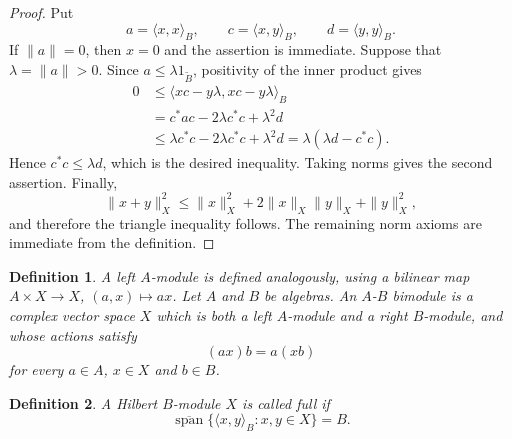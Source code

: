 \documentclass{book}
\newtheorem{definition}{Definition}[section]
\begin{document}
\begin{proof}
  Put
  \[
    a=\langle x,x\rangle_B,
    \qquad
    c=\langle x,y\rangle_B,
    \qquad
    d=\langle y,y\rangle_B.
  \]
  If \(\|a\|=0\), then \(x=0\) and the assertion is immediate. Suppose that
  \(\lambda=\|a\|>0\). Since \(a\leq\lambda 1_{\widetilde B}\), positivity of the
  inner product gives
  \begin{align*}
    0
    &\leq
    \langle xc-y\lambda,xc-y\lambda\rangle_B\\
    &=c^*ac-2\lambda c^*c+\lambda^2d\\
    &\leq
    \lambda c^*c-2\lambda c^*c+\lambda^2d
     =\lambda(\lambda d-c^*c).
  \end{align*}
  Hence \(c^*c\leq\lambda d\), which is the desired inequality. Taking norms
  gives the second assertion. Finally,
  \[
    \|x+y\|_X^2
    \leq
    \|x\|_X^2+2\|x\|_X\|y\|_X+\|y\|_X^2,
  \]
  and therefore the triangle inequality follows. The remaining norm axioms are
  immediate from the definition.
\end{proof}
\begin{definition}
  A \textnormal{left \(A\)-module} is defined analogously, using a bilinear
  map \(A\times X\to X\), \((a,x)\mapsto ax\). Let \(A\) and \(B\) be
  algebras. An \textnormal{\(A\)-\(B\) bimodule} is a complex vector space
  \(X\) which is both a left \(A\)-module and a right \(B\)-module, and whose
  actions satisfy
  \[
    (ax)b=a(xb)
  \]
  for every \(a\in A\), \(x\in X\) and \(b\in B\).
\end{definition}
\begin{definition}
A Hilbert \(B\)-module \(X\) is called \textnormal{full} if
\[
  \overline{\operatorname{span}}
  \{\langle x,y\rangle_B:x,y\in X\}
  =
  B.
\]
\end{definition}
\end{document}
